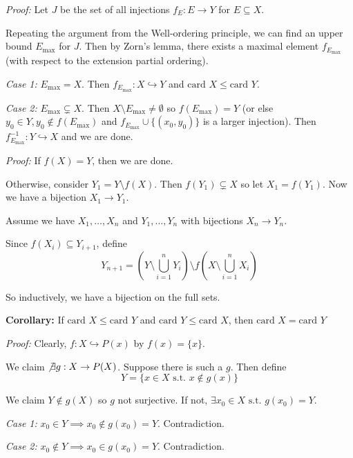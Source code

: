 \documentclass[12pt]{article}
\newcommand{\sub}{\subseteq}
\newcommand{\st}{\text{ s.t. }}
\newcommand{\card}{\text{card }}
\newcommand{\inj}{\hookrightarrow}
\newcommand{\biject}{\hookrightarrow \hspace{-8pt} \rightarrow}
\newenvironment*{tbox}[2][gray]{
    \begin{tcolorbox}[
        parbox=false,
        colback=#1!5!white,
        colframe=#1!75!black,
        breakable,
        title={#2}
    ]}
    {\end{tcolorbox}}
\begin{document}
    \begin{tbox}{\textbf{Property:} Either $\card X \leq \card Y$ or $\card Y \leq \card X$}
        \emph{Proof:} Let $J$ be the set of all injections $f_E: E \to Y$ for $E \sub X$. 
        
        Repeating the argument from the Well-ordering principle, we can find an upper bound $E_{\max}$ for $J$. Then by Zorn's lemma, there exists a maximal element $f_{E_{\max}}$ (with respect to the extension partial ordering). 

        \emph{Case 1:} $E_{\max} = X$. Then $f_{E_{\max}}: X \inj Y$ and $\card X \leq \card Y$.

        \emph{Case 2:} $E_{\max} \subsetneq X$. Then $X \setminus E_{\max} \neq \emptyset$ so $f(E_{\max}) = Y$ (or else $y_0 \in Y, y_0 \notin f(E_{\max})$ and $f_{E_{\max}} \cup \{(x_0, y_0)\}$ is a larger injection). Then $f_{E_{\max}}^{-1}: Y \inj X$ and we are done. 
    \end{tbox}

    \begin{tbox}{\textbf{Schröder-Bernstein Theorem:} If $f: X \inj Y$ and $g: Y \inj X$, then $\exists h: X \biject Y$}
        \emph{Proof:} If $f(X) = Y$, then we are done. 

        Otherwise, consider $Y_1 = Y \setminus f(X)$. Then $f(Y_1) \subsetneq X$ so let $X_1 = f(Y_1)$. Now we have a bijection $X_1 \to Y_1$. 

        Assume we have $X_1, \dots, X_n$ and $Y_1, \dots, Y_n$ with bijections $X_n \to Y_n$. 

        Since $f(X_i) \sub Y_{i+1}$, define 
        \[Y_{n+1} = \left(Y \setminus \bigcup_{i=1}^n Y_i\right) \setminus f\left(X \setminus \bigcup_{i=1}^n X_i \right)\]

        So inductively, we have a bijection on the full sets. 
    \end{tbox}

    \textbf{Corollary:} If $\card X \leq \card Y$ and $\card Y \leq \card X$, then $\card X = \card Y$

    \begin{tbox}{\textbf{Proposition:} $\card X < \card P(X)$}
        \emph{Proof:} Clearly, $f: X \inj P(x)$ by $f(x) = \{x\}$. 

        We claim $\not\exists g: X \to P(X)$. Suppose there is such a $g$. Then define 
        \[Y = \{x \in X \st x \notin g(x)\}\]
        
        We claim $Y \notin g(X)$ so $g$ not surjective. If not, $\exists x_0 \in X \st g(x_0) = Y$. 

        \emph{Case 1:} $x_0 \in Y \implies x_0 \notin g(x_0) = Y$. Contradiction. 

        \emph{Case 2:} $x_0 \notin Y \implies x_0 \in g(x_0) = Y$. Contradiction.
    \end{tbox}
    
\end{document}
